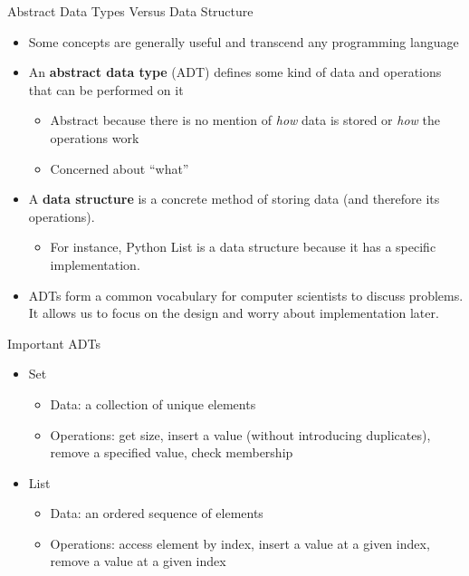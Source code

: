 \documentclass[
  ignorenonframetext,
]{beamer}
\providecommand{\tightlist}{%
  \setlength{\itemsep}{0pt}\setlength{\parskip}{0pt}}\usepackage{longtable,booktabs,array}
\begin{document}
\begin{frame}{Abstract Data Types Versus Data Structure}
\protect\hypertarget{abstract-data-types-versus-data-structure}{}
\begin{itemize}
\item
  Some concepts are generally useful and transcend any programming
  language
\item
  An \textbf{abstract data type} (ADT) defines some kind of data and
  operations that can be performed on it

  \begin{itemize}
  \item
    Abstract because there is no mention of \emph{how} data is stored or
    \emph{how} the operations work
  \item
    Concerned about ``what''
  \end{itemize}
\item
  A \textbf{data structure} is a concrete method of storing data (and
  therefore its operations).

  \begin{itemize}
  \tightlist
  \item
    For instance, Python List is a data structure because it has a
    specific implementation.
  \end{itemize}
\item
  ADTs form a common vocabulary for computer scientists to discuss
  problems. It allows us to focus on the design and worry about
  implementation later.
\end{itemize}
\end{frame}

\begin{frame}{Important ADTs}
\protect\hypertarget{important-adts}{}
\begin{itemize}
\item
  Set

  \begin{itemize}
  \item
    Data: a collection of unique elements
  \item
    Operations: get size, insert a value (without introducing
    duplicates), remove a specified value, check membership
  \end{itemize}
\item
  List

  \begin{itemize}
  \item
    Data: an ordered sequence of elements
  \item
    Operations: access element by index, insert a value at a given
    index, remove a value at a given index
  \end{itemize}
\end{itemize}
\end{frame}
\end{document}
